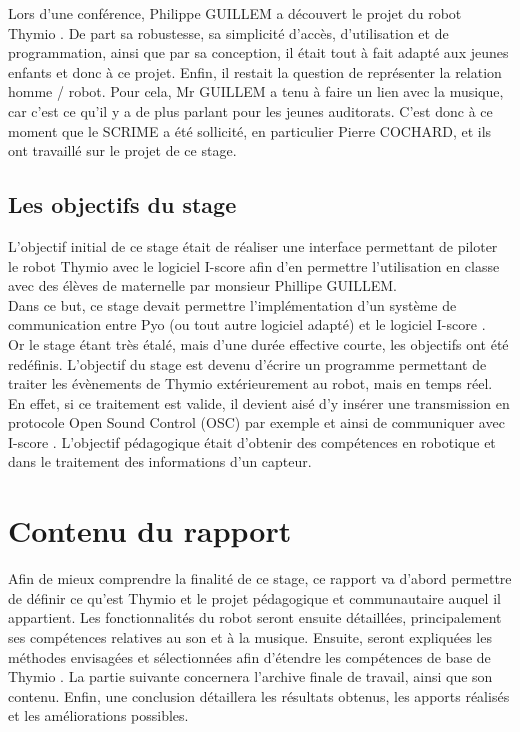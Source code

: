 \documentclass[a4paper, 12pt]{report}
\begin{document}
Lors d'une conférence, Philippe GUILLEM a découvert le projet du robot Thymio \pageref{thymio}. De part sa robustesse, sa simplicité d'accès, d'utilisation et de programmation, ainsi que par sa conception, il était tout à fait adapté aux jeunes enfants et donc à ce projet.
Enfin, il restait la question de représenter la relation homme / robot. Pour cela, Mr GUILLEM a tenu à faire un lien avec la musique, car c'est ce qu'il y a de plus parlant pour les jeunes auditorats. C'est donc à ce moment que le SCRIME a été sollicité, en particulier Pierre COCHARD, et ils ont travaillé sur le projet de ce stage.


\subsection{Les objectifs du stage}
L'objectif initial de ce stage était de réaliser une interface permettant de piloter le robot Thymio \pageref{thymio} avec le logiciel I-score afin d'en permettre l'utilisation en classe avec des élèves de maternelle par monsieur Phillipe GUILLEM. \\
Dans ce but, ce stage devait permettre l'implémentation d'un système de communication entre Pyo \cite{PYO2016} (ou tout autre logiciel adapté) et le logiciel I-score \cite{ISCORE}.\\
Or le stage étant très étalé, mais d'une durée effective courte, les objectifs ont été redéfinis. L'objectif du stage est devenu d'écrire un programme permettant de traiter les évènements de Thymio extérieurement au robot, mais en temps réel. En effet, si ce traitement est valide, il devient aisé d'y insérer une transmission en protocole Open Sound Control (OSC) \cite{OSC2016} par exemple et ainsi de communiquer avec I-score  \cite{ISCORE}.
L'objectif pédagogique était d'obtenir des compétences en robotique et dans le traitement des informations d'un capteur. 

\section{Contenu du rapport}
Afin de mieux comprendre la finalité de ce stage, ce rapport va d'abord permettre de définir ce qu'est Thymio \pageref{thymio} et le projet pédagogique et communautaire auquel il appartient. 
Les fonctionnalités du robot seront ensuite détaillées, principalement ses compétences relatives au son et à la musique. Ensuite, seront expliquées les méthodes envisagées et sélectionnées afin d'étendre les compétences de base de Thymio \pageref{thymio}. 
La partie suivante concernera l'archive finale de travail, ainsi que son contenu.
Enfin, une conclusion détaillera les résultats obtenus, les apports réalisés et les améliorations possibles.
\end{document}
